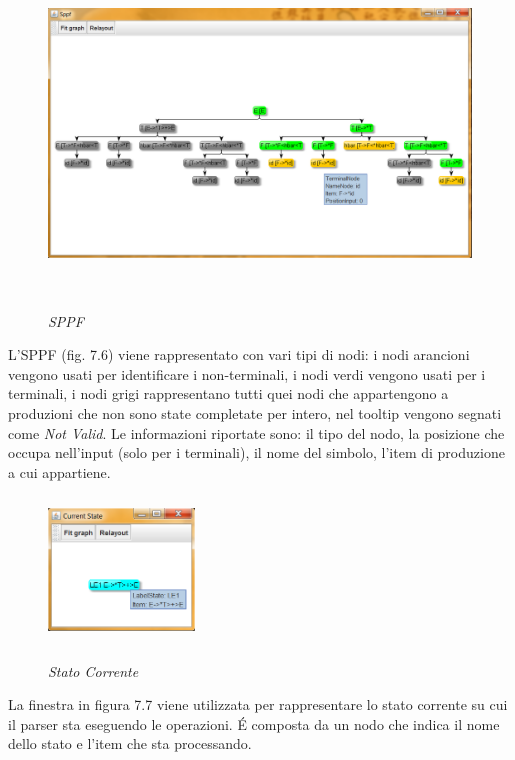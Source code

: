 \begin{figure}[hbpb]\label{SPPF}
	{\includegraphics[height=240pt,width=410pt,scale=0.1]{files/SPPF.png}}
	\caption{\textit{SPPF}}
\end{figure}
\noindent L'SPPF (fig. 7.6) viene rappresentato con vari tipi di nodi: i nodi arancioni vengono usati per identificare i non-terminali, i nodi verdi vengono usati per i terminali, i nodi grigi rappresentano tutti quei nodi che appartengono a produzioni che non sono state completate per intero, nel tooltip vengono segnati come \textit{Not Valid}. Le informazioni riportate sono: il tipo del nodo, la posizione che occupa nell'input (solo per i terminali), il nome del simbolo, l'item di produzione a cui appartiene.\par 
\begin{figure}[hbpb]\label{currentState}
	\centering
	{\includegraphics[height=110pt,width=110pt,scale=0.1]{files/CurrentState.png}}
	\caption{\textit{Stato Corrente}}
\end{figure}
\noindent La finestra in figura 7.7 viene utilizzata per rappresentare lo stato corrente su cui il parser sta eseguendo le operazioni. \'E composta da un nodo che indica il nome dello stato e l'item che sta processando.\par
